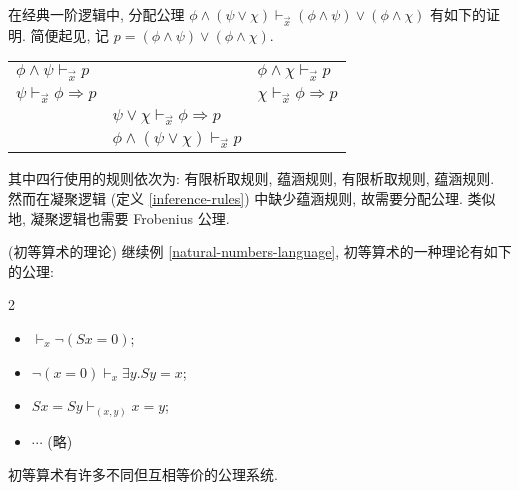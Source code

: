 \begin{example}
	{}
	在经典一阶逻辑中, 分配公理 $\phi\wedge(\psi\vee\chi)\vdash_{\vec{x}}(\phi\wedge\psi)\vee(\phi\wedge\chi)$ 有如下的证明.
	简便起见, 记 $p=(\phi\wedge\psi)\vee(\phi\wedge\chi)$.
	\begin{center}
		\begin{tabular}{lll}
			$\phi\land\psi \vdash_{\vec{x}}  p$&&$\phi\land\chi \vdash_{\vec{x}}  p$  \\ \cline{1-1} \cline{3-3} 
			$\psi \vdash_{\vec{x}} \phi\Rightarrow p$
			&&
			$\chi \vdash_{\vec{x}} \phi\Rightarrow p$
			\\ \hline
			& $\psi\lor\chi \vdash_{\vec{x}} \phi\Rightarrow p$ &  \\ \cline{2-2}
			& $\phi\wedge(\psi\vee\chi)\vdash_{\vec{x}}p$&
		\end{tabular}
	\end{center}
	其中四行使用的规则依次为: 有限析取规则, 蕴涵规则, 有限析取规则, 蕴涵规则. 然而在凝聚逻辑 (定义 \ref{inference-rules}) 中缺少蕴涵规则, 故需要分配公理. 类似地, 凝聚逻辑也需要 Frobenius 公理.
\end{example}

\begin{example}
	{(初等算术的理论)}
	继续例 \ref{natural-numbers-language}, 初等算术的一种理论有如下的公理:
	\begin{multicols*}
		{2}
		\begin{itemize}
			\item $\vdash_x \neg (Sx=0)$;
			\item $\neg(x=0) \vdash_{x} \exists y. Sy=x$;
			\item $Sx=Sy\vdash_{(x,y)} x=y$;
			\item $\cdots$ (略)
		\end{itemize}
	\end{multicols*}
	
	初等算术有许多不同但互相等价的公理系统.
\end{example}

